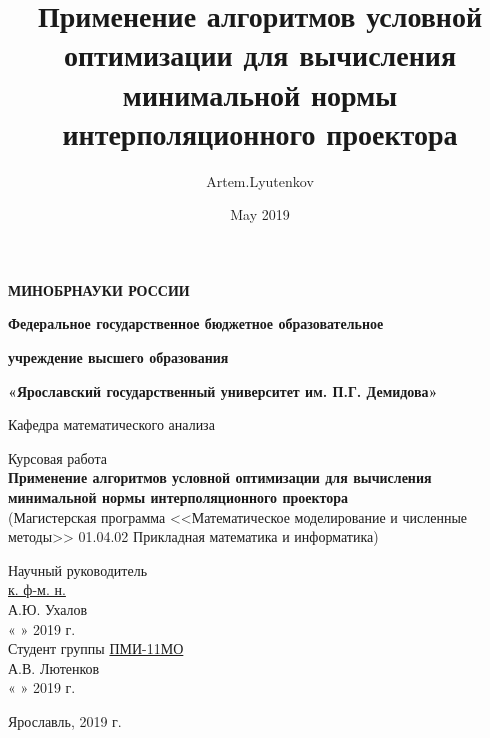 \documentclass[12pt]{article} %
\title{Применение алгоритмов условной оптимизации для вычисления минимальной нормы интерполяционного проектора}
\author{Artem.Lyutenkov }
\date{May 2019}
\begin{document}
	\begin{titlepage} 
		 \begin{center}
			\large
			\textbf{МИНОБРНАУКИ РОССИИ}
			
			
			\vspace{0.5cm}
			
		\textbf{Федеральное государственное бюджетное образовательное}
		
		\textbf{учреждение высшего образования}
		
		\textbf{«Ярославский государственный университет им. П.Г. Демидова»}
			\vspace{0.25cm}
			
			
			Кафедра математического анализа
			\vfill
			
			Курсовая работа \\
			\textbf{Применение алгоритмов условной оптимизации для вычисления минимальной нормы интерполяционного проектора} \\
			(Магистерская программа <<Математическое моделирование и численные методы>> 01.04.02 Прикладная математика и информатика) 
			\vfill
			
			
			\bigskip
			
			
		\end{center}

\begin{flushright} 
	Научный руководитель\\ 
	\underline{\phantom{aaааааa}к. ф-м. н.\phantom{aааааaa}}\\ 
	\vspace{0.1cm} 
	\underline{\phantom{aaaaaaaaaaaaa}} А.Ю. Ухалов\\ 
	« 
	\underline{\phantom{aaa}} 
	» 
	\underline{\phantom{aaaaaaaaaaaaa}} 2019 г.\\ 
	\vspace{0.5cm} 
	Студент группы \underline{\phantom{a}ПМИ-11МО\phantom{a}}\\ 
	\vspace{0.1cm} 
	\underline{\phantom{aaaaaaaaaaaaa}} А.В. Лютенков\\ 
	« 
	\underline{\phantom{aaa}} 
	» 
	\underline{\phantom{aaaaaaaaaaaaaa}}2019 г.\\ 
	\vspace{1cm} 
\end{flushright} 
		\begin{center}
			Ярославль, 2019 г.
		\end{center}
\end{titlepage}
\tableofcontents \thispagestyle{empty}
\setcounter{page}{2}
\end{document}
